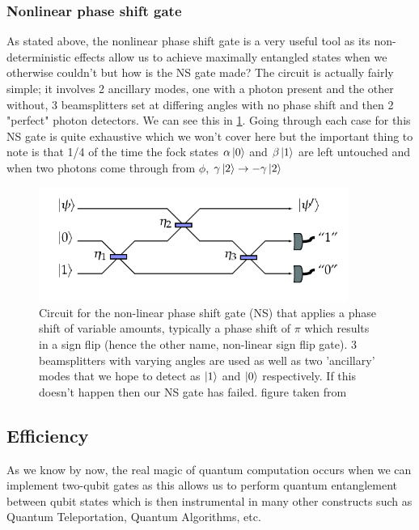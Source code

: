 \subsubsection{Nonlinear phase shift gate}
As stated above, the nonlinear phase shift gate is a very useful tool as its non-deterministic effects allow us to achieve maximally entangled states when we otherwise couldn't but how is the NS gate made? The circuit is actually fairly simple; it involves 2 ancillary modes, one with a photon present and the other without, 3 beamsplitters set at differing angles with no phase shift and then 2 "perfect" photon detectors. We can see this in \cref{fig:NS_gate}. Going through each case for this NS gate is quite exhaustive which we won't cover here but the important thing to note is that 1/4 of the time the fock states $\alpha\ket{0}$ and $\beta\ket{1}$ are left untouched and when two photons come through from $\phi$, $\gamma\ket{2} \rightarrow -\gamma\ket{2}$ 

\begin{figure}[H]
    \centering
    \includegraphics[width=0.9\textwidth]{images/NS gate.png}
    \caption{Circuit for the non-linear phase shift gate (NS) that applies a phase shift of variable amounts, typically a phase shift of $\pi$ which results in a sign flip (hence the other name, non-linear sign flip gate). 3 beamsplitters with varying angles are used as well as two 'ancillary' modes that we hope to detect as $\ket{1}$ and $\ket{0}$ respectively. If this doesn't happen then our NS gate has failed. figure taken from \cite{Kok:2005jip}}\label{fig:NS_gate}
\end{figure}



\subsection{Efficiency}
As we know by now, the real magic of quantum computation occurs when we can implement two-qubit gates as this allows us to perform quantum entanglement between qubit states which is then instrumental in many other constructs such as Quantum Teleportation, Quantum Algorithms, etc.

